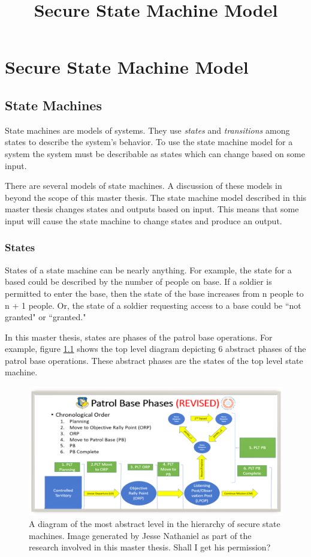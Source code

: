 \documentclass[../../main/main.tex]{subfiles}
\begin{document}
\title{Secure State Machine Model}

\chapter{Secure State Machine Model}\label{chp:ssmmodel}

\section{State Machines}\label{sec:sm}
State machines are models of systems.  They use \textit{states} and \textit{transitions} among states to describe the system's behavior.  To use the state machine model for a system the system must be describable as states which can change based on some input.    

There are several models of state machines.  A discussion of these models in beyond the scope of this master thesis.  The state machine model described in this master thesis changes states and outputs based on input.  This means that some input will cause the state machine to change states and produce an output.

\subsection{States}
States of a state machine can be nearly anything.  For example, the state for a based could be described by the number of people on base.  If a soldier is permitted to enter the base, then the state of the base increases from n people to n + 1 people. Or, the state of a soldier requesting access to a base could be ``not granted" or ``granted."

In this master thesis, states are phases of the patrol base operations.  For example, figure \ref{pbtoplevel2} shows the top level diagram depicting 6 abstract phases of the patrol base operations.  These abstract phases are the states of the top level state machine.

\begin{figure}[h]
\includegraphics[width=\textwidth]{../figures/pbtoplevel}
\caption{\label{pbtoplevel2}A diagram of the most abstract level in the hierarchy of secure state machines.  Image generated by Jesse Nathaniel as part of the research involved in this master thesis.  Shall I get his permission?}
\end{figure}
\end{document}
